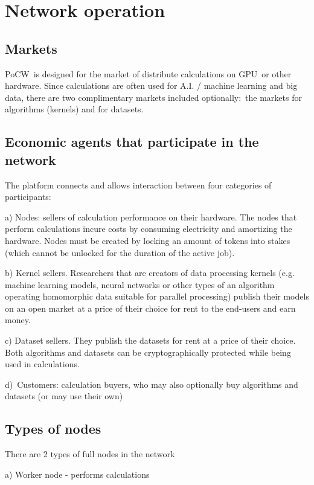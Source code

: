 \documentclass{article}
\begin{document}
\section{Network operation}

\subsection{Markets}

PoCW\ is designed for the market of distribute calculations on GPU\ or other
hardware. Since calculations are often used for A.I. / machine learning and
big data, there are two complimentary markets included optionally:\ the
markets for algorithms (kernels) and for datasets.

\subsection{Economic agents that participate in the network}

The platform connects and allows interaction between four categories of
participants:

a) Nodes: sellers of calculation performance on their hardware. The nodes
that perform calculations incure costs by consuming electricity and
amortizing the hardware. Nodes must be created by locking an amount of
tokens into stakes (which cannot be unlocked for the duration of the active
job).

b) Kernel sellers. Researchers that are creators of data processing kernels
(e.g. machine learning models, neural networks or other types of an
algorithm operating homomorphic data suitable for parallel processing)
publish their models on an open market at a price of their choice for rent
to the end-users and earn money.

c) Dataset sellers. They publish the datasets for rent at a price of their
choice. Both algorithms and datasets can be cryptographically protected
while being used in calculations.

d)\ Customers: calculation buyers, who may also optionally buy algorithms
and datasets (or may use their own)

\subsection{Types of nodes}

There are 2 types of full nodes in the network

a) Worker node - performs calculations
\end{document}
